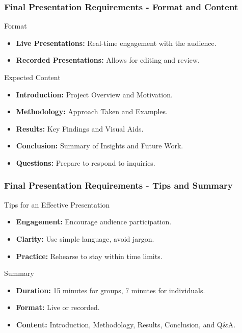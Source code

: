 \documentclass[aspectratio=169]{beamer}
\begin{document}
\begin{frame}[fragile]
    \frametitle{Final Presentation Requirements - Format and Content}
    \begin{block}{Format}
        \begin{itemize}
            \item \textbf{Live Presentations:} Real-time engagement with the audience.
            \item \textbf{Recorded Presentations:} Allows for editing and review.
        \end{itemize}
    \end{block}
    
    \begin{block}{Expected Content}
        \begin{itemize}
            \item \textbf{Introduction:} Project Overview and Motivation.
            \item \textbf{Methodology:} Approach Taken and Examples.
            \item \textbf{Results:} Key Findings and Visual Aids.
            \item \textbf{Conclusion:} Summary of Insights and Future Work.
            \item \textbf{Questions:} Prepare to respond to inquiries.
        \end{itemize}
    \end{block}
\end{frame}

\begin{frame}[fragile]
    \frametitle{Final Presentation Requirements - Tips and Summary}
    \begin{block}{Tips for an Effective Presentation}
        \begin{itemize}
            \item \textbf{Engagement:} Encourage audience participation.
            \item \textbf{Clarity:} Use simple language, avoid jargon.
            \item \textbf{Practice:} Rehearse to stay within time limits.
        \end{itemize}
    \end{block}
    
    \begin{block}{Summary}
        \begin{itemize}
            \item \textbf{Duration:} 15 minutes for groups, 7 minutes for individuals.
            \item \textbf{Format:} Live or recorded.
            \item \textbf{Content:} Introduction, Methodology, Results, Conclusion, and Q\&A.
        \end{itemize}
    \end{block}
\end{frame}
\end{document}
